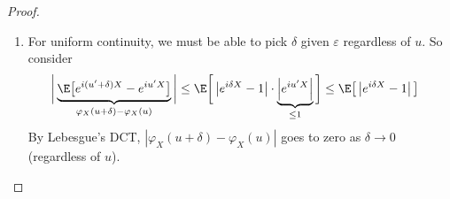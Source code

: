\documentclass[12pt]{article}
\theoremstyle{plain}
\theoremstyle{definition}
\theoremstyle{remark}
\newcommand{\ra}{\rightarrow}
\begin{document}
\begin{proof}
\begin{enumerate}[label=(\roman*)]
  \item For uniform continuity, we must be able to pick
    $\delta$ given $\varepsilon$ regardless of $u$. So consider
    \begin{align*}
      \bigg\lvert
        \underbrace{%
          \E\big[ e^{i(u'+\delta)X} - e^{iu'X} \big]
        }_{\varphi_X(u+\delta)-\varphi_X(u)}
      \bigg\rvert
      &\leq
      \E\bigg[
      \left\lvert
      e^{i\delta X}-1
      \right\rvert
      \cdot
      \underbrace{\left\lvert e^{iu'X} \right\rvert}_{\leq 1}
      \bigg]
      \leq
      \E\big[
      \left\lvert
      e^{i\delta X}-1
      \right\rvert
      \big]
    \end{align*}
    By Lebesgue's DCT, $|\varphi_X(u+\delta)-\varphi_X(u)|$
    goes to zero as $\delta\ra 0$ (regardless of $u$).
\end{enumerate}
\end{proof}
\end{document}
